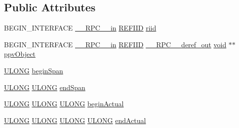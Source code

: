 \subsection*{Public Attributes}
\begin{DoxyCompactItemize}
\item 
B\+E\+G\+I\+N\+\_\+\+I\+N\+T\+E\+R\+F\+A\+CE \hyperlink{rpcsal_8h_a20b7f6da600a05c8b541659f14f7f0e6}{\+\_\+\+\_\+\+R\+P\+C\+\_\+\+\_\+in} \hyperlink{px__win__ds_8c_a80ec49c8ae61e234197d5071d2df497d}{R\+E\+F\+I\+ID} \hyperlink{struct_i_named_entity_collector_vtbl_a684365f0bf884695fb0471a289301150}{riid}
\item 
B\+E\+G\+I\+N\+\_\+\+I\+N\+T\+E\+R\+F\+A\+CE \hyperlink{rpcsal_8h_a20b7f6da600a05c8b541659f14f7f0e6}{\+\_\+\+\_\+\+R\+P\+C\+\_\+\+\_\+in} \hyperlink{px__win__ds_8c_a80ec49c8ae61e234197d5071d2df497d}{R\+E\+F\+I\+ID} \hyperlink{rpcsal_8h_a23bc188526f10656f9c79d950f6c3192}{\+\_\+\+\_\+\+R\+P\+C\+\_\+\+\_\+deref\+\_\+out} \hyperlink{sound_8c_ae35f5844602719cf66324f4de2a658b3}{void} $\ast$$\ast$ \hyperlink{struct_i_named_entity_collector_vtbl_a8680ca54dd752d23a7d32d5198190f80}{ppv\+Object}
\item 
\hyperlink{struct_i_named_entity_collector_vtbl_af593c0f31c0f80342fbc99faa83c6f2b}{U\+L\+O\+NG} \hyperlink{struct_i_named_entity_collector_vtbl_a1e833f0724588429f63e0d995c8e3661}{begin\+Span}
\item 
\hyperlink{struct_i_named_entity_collector_vtbl_af593c0f31c0f80342fbc99faa83c6f2b}{U\+L\+O\+NG} \hyperlink{struct_i_named_entity_collector_vtbl_af593c0f31c0f80342fbc99faa83c6f2b}{U\+L\+O\+NG} \hyperlink{struct_i_named_entity_collector_vtbl_abcc298751d9ec8866030295d17ba6c10}{end\+Span}
\item 
\hyperlink{struct_i_named_entity_collector_vtbl_af593c0f31c0f80342fbc99faa83c6f2b}{U\+L\+O\+NG} \hyperlink{struct_i_named_entity_collector_vtbl_af593c0f31c0f80342fbc99faa83c6f2b}{U\+L\+O\+NG} \hyperlink{struct_i_named_entity_collector_vtbl_af593c0f31c0f80342fbc99faa83c6f2b}{U\+L\+O\+NG} \hyperlink{struct_i_named_entity_collector_vtbl_a26a7a2d8080d4e6bef0691a28dce70ad}{begin\+Actual}
\item 
\hyperlink{struct_i_named_entity_collector_vtbl_af593c0f31c0f80342fbc99faa83c6f2b}{U\+L\+O\+NG} \hyperlink{struct_i_named_entity_collector_vtbl_af593c0f31c0f80342fbc99faa83c6f2b}{U\+L\+O\+NG} \hyperlink{struct_i_named_entity_collector_vtbl_af593c0f31c0f80342fbc99faa83c6f2b}{U\+L\+O\+NG} \hyperlink{struct_i_named_entity_collector_vtbl_af593c0f31c0f80342fbc99faa83c6f2b}{U\+L\+O\+NG} \hyperlink{struct_i_named_entity_collector_vtbl_a4f4fdd3e987b8bc9969fd8b8569e6cf6}{end\+Actual}
$$
\end{DoxyCompactItemize}
